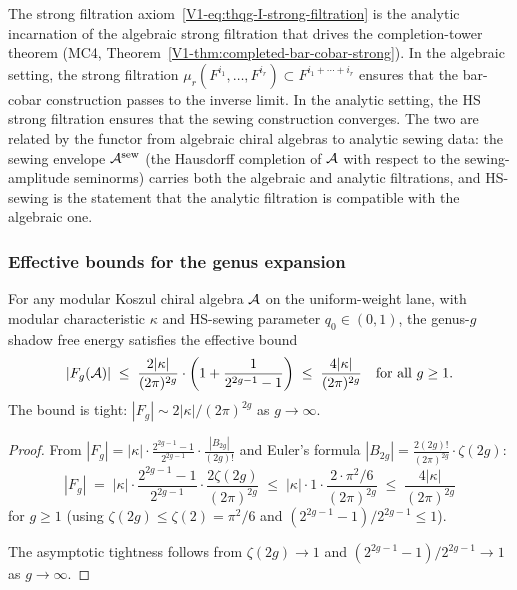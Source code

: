 \begin{remark}[Connection to MC4]
The strong filtration axiom~\eqref{V1-eq:thqg-I-strong-filtration} is the analytic incarnation of the algebraic strong filtration that drives the completion-tower theorem (MC4, Theorem~\ref{V1-thm:completed-bar-cobar-strong}). In the algebraic setting, the strong filtration $\mu_r(F^{i_1}, \ldots, F^{i_r}) \subset F^{i_1 + \cdots + i_r}$ ensures that the bar-cobar construction passes to the inverse limit. In the analytic setting, the HS strong filtration ensures that the sewing construction converges. The two are related by the functor from algebraic chiral algebras to analytic sewing data: the sewing envelope $\mathcal{A}^{\mathrm{sew}}$ (the Hausdorff completion of $\mathcal{A}$ with respect to the sewing-amplitude seminorms) carries both the algebraic and analytic filtrations, and HS-sewing is the statement that the analytic filtration is compatible with the algebraic one.
\end{remark}

\subsubsection{Effective bounds for the genus expansion}

\begin{proposition}
For any modular Koszul chiral algebra $\mathcal{A}$ on the uniform-weight lane, with modular characteristic $\kappa$ and
HS-sewing parameter $q_0 \in (0,1)$, the genus-$g$ shadow free
energy satisfies the effective bound
\begin{equation}%
|F_g(\cA)| \;\leq\; \frac{2|\kappa|}{(2\pi)^{2g}} \cdot \left(1 + \frac{1}{2^{2g-1} - 1}\right) \;\leq\; \frac{4|\kappa|}{(2\pi)^{2g}} \quad\text{for all } g \geq 1.
\end{equation}
The bound is tight: $|F_g| \sim 2|\kappa|/(2\pi)^{2g}$ as $g \to \infty$.
\end{proposition}

\begin{proof}
From $|F_g| = |\kappa| \cdot \frac{2^{2g-1}-1}{2^{2g-1}} \cdot \frac{|B_{2g}|}{(2g)!}$ and Euler's formula $|B_{2g}| = \frac{2(2g)!}{(2\pi)^{2g}} \cdot \zeta(2g)$:
\[
|F_g| \;=\; |\kappa| \cdot \frac{2^{2g-1}-1}{2^{2g-1}} \cdot \frac{2\zeta(2g)}{(2\pi)^{2g}} \;\leq\; |\kappa| \cdot 1 \cdot \frac{2 \cdot \pi^2/6}{(2\pi)^{2g}} \;\leq\; \frac{4|\kappa|}{(2\pi)^{2g}}
\]
for $g \geq 1$ (using $\zeta(2g) \leq \zeta(2) = \pi^2/6$ and $(2^{2g-1}-1)/2^{2g-1} \leq 1$).

The asymptotic tightness follows from $\zeta(2g) \to 1$ and $(2^{2g-1}-1)/2^{2g-1} \to 1$ as $g \to \infty$.
\end{proof}

